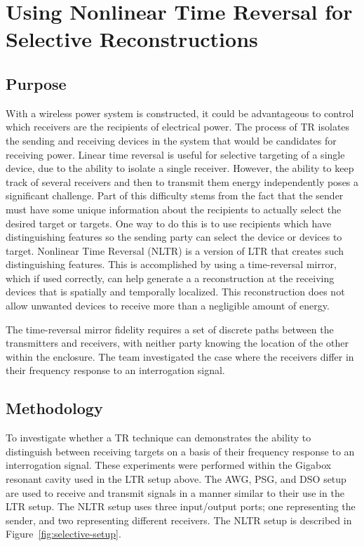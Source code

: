 \chapter{Using Nonlinear Time Reversal for Selective Reconstructions}
\label{ch:selective}

\section{Purpose}
\label{sec:selective-purpose}

With a wireless power system is constructed, it could be advantageous to control which receivers are the recipients of electrical power. The process of TR isolates the sending and receiving devices in the system that would be candidates for receiving power. Linear time reversal is useful for selective targeting of a single device, due to the ability to isolate a single receiver. However, the ability to keep track of several receivers and then to transmit them energy independently poses a significant challenge. Part of this difficulty stems from the fact that the sender must have some unique information about the recipients to actually select the desired target or targets. One way to do this is to use recipients which have distinguishing features so the sending party can select the device or devices to target. Nonlinear Time Reversal (NLTR) is a version of LTR that creates such distinguishing features. This is accomplished by using a time-reversal mirror, which if used correctly, can help generate a a reconstruction at the receiving devices that is spatially and temporally localized. This reconstruction does not allow unwanted devices to receive more than a negligible amount of energy.

The time-reversal mirror fidelity requires a set of discrete paths between the transmitters and receivers, with neither party knowing the location of the other within the enclosure. The team investigated the case where the receivers differ in their frequency response to an interrogation signal.

\section{Methodology}
\label{sec:selective-meth}

To investigate whether a TR technique can demonstrates the ability to distinguish between receiving targets on a basis of their frequency response to an interrogation signal. These experiments were performed within the Gigabox resonant cavity used in the LTR setup above. The AWG, PSG, and DSO setup are used to receive and transmit signals in a manner similar to their use in the LTR setup. The NLTR setup uses three input/output ports; one representing the sender, and two representing different receivers. The NLTR setup is described in Figure~\ref{fig:selective-setup}.


